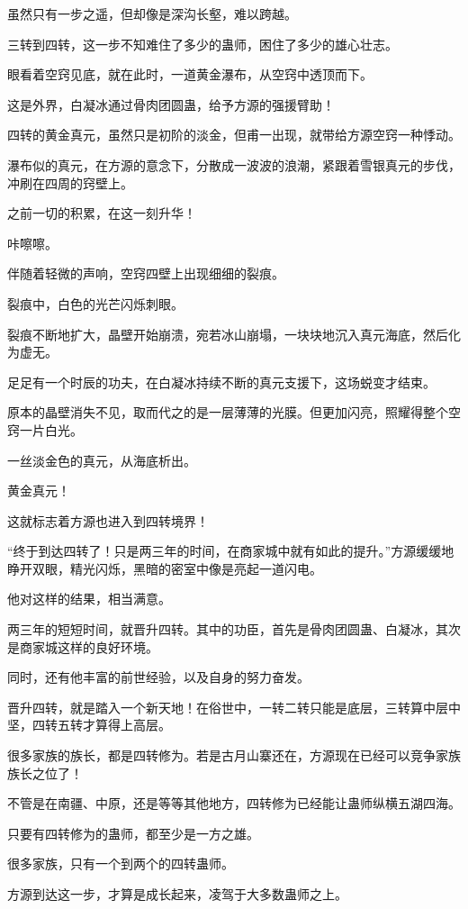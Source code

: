 \begin{this_body}
虽然只有一步之遥，但却像是深沟长壑，难以跨越。

三转到四转，这一步不知难住了多少的蛊师，困住了多少的雄心壮志。

眼看着空窍见底，就在此时，一道黄金瀑布，从空窍中透顶而下。

这是外界，白凝冰通过骨肉团圆蛊，给予方源的强援臂助！

四转的黄金真元，虽然只是初阶的淡金，但甫一出现，就带给方源空窍一种悸动。

瀑布似的真元，在方源的意念下，分散成一波波的浪潮，紧跟着雪银真元的步伐，冲刷在四周的窍壁上。

之前一切的积累，在这一刻升华！

咔嚓嚓。

伴随着轻微的声响，空窍四壁上出现细细的裂痕。

裂痕中，白色的光芒闪烁刺眼。

裂痕不断地扩大，晶壁开始崩溃，宛若冰山崩塌，一块块地沉入真元海底，然后化为虚无。

足足有一个时辰的功夫，在白凝冰持续不断的真元支援下，这场蜕变才结束。

原本的晶壁消失不见，取而代之的是一层薄薄的光膜。但更加闪亮，照耀得整个空窍一片白光。

一丝淡金色的真元，从海底析出。

黄金真元！

这就标志着方源也进入到四转境界！

“终于到达四转了！只是两三年的时间，在商家城中就有如此的提升。”方源缓缓地睁开双眼，精光闪烁，黑暗的密室中像是亮起一道闪电。

他对这样的结果，相当满意。

两三年的短短时间，就晋升四转。其中的功臣，首先是骨肉团圆蛊、白凝冰，其次是商家城这样的良好环境。

同时，还有他丰富的前世经验，以及自身的努力奋发。

晋升四转，就是踏入一个新天地！在俗世中，一转二转只能是底层，三转算中层中坚，四转五转才算得上高层。

很多家族的族长，都是四转修为。若是古月山寨还在，方源现在已经可以竞争家族族长之位了！

不管是在南疆、中原，还是等等其他地方，四转修为已经能让蛊师纵横五湖四海。

只要有四转修为的蛊师，都至少是一方之雄。

很多家族，只有一个到两个的四转蛊师。

方源到达这一步，才算是成长起来，凌驾于大多数蛊师之上。


\end{this_body}
